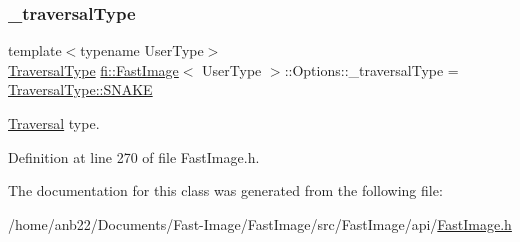 \subsubsection{\texorpdfstring{\+\_\+traversal\+Type}{\_traversalType}}
{\footnotesize\ttfamily template$<$typename User\+Type$>$ \\
\hyperlink{namespacefi_a7ba5ce68668e7f273b22e5f56ca6dfcb}{Traversal\+Type} \hyperlink{classfi_1_1FastImage}{fi\+::\+Fast\+Image}$<$ User\+Type $>$\+::Options\+::\+\_\+traversal\+Type = \hyperlink{namespacefi_a7ba5ce68668e7f273b22e5f56ca6dfcba6a30da74d0b15b45ec14072c93b6645d}{Traversal\+Type\+::\+S\+N\+A\+KE}\hspace{0.3cm}{\ttfamily [private]}}



\hyperlink{classfi_1_1Traversal}{Traversal} type. 



Definition at line 270 of file Fast\+Image.\+h.



The documentation for this class was generated from the following file\+:\begin{DoxyCompactItemize}
\item 
/home/anb22/\+Documents/\+Fast-\/\+Image/\+Fast\+Image/src/\+Fast\+Image/api/\hyperlink{FastImage_8h}{Fast\+Image.\+h}\end{DoxyCompactItemize}
